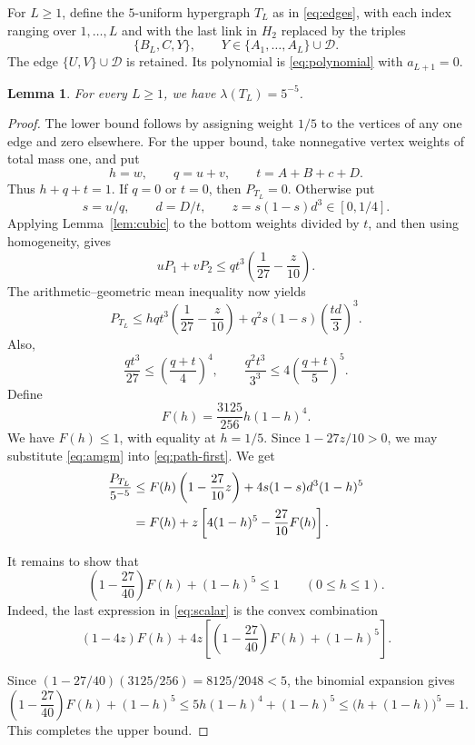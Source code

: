 \documentclass[11pt]{article}
\newtheorem{lemma}[theorem]{Lemma}
\numberwithin{equation}{section}
\newcommand{\D}{\mathcal D}
\begin{document}
For \(L\ge1\), define the \(5\)-uniform hypergraph \(T_L\)
as in \eqref{eq:edges}, with each index ranging over \(1,\ldots,L\)
and with the last link in \(H_2\) replaced by the triples
\[
 \{B_L,C,Y\},\qquad Y\in\{A_1,\ldots,A_L\}\cup\D.
\]
The edge \(\{U,V\}\cup\D\) is retained.
Its polynomial is \eqref{eq:polynomial} with \(a_{L+1}=0\).

\begin{lemma}\label{lem:path}
For every \(L\ge1\), we have \(\lambda(T_L)=5^{-5}\).
\end{lemma}

\begin{proof}
The lower bound follows by assigning weight \(1/5\) to the vertices
of any one edge and zero elsewhere. For the upper bound, take
nonnegative vertex weights of total mass one, and put
\[
 h=w,\qquad q=u+v,\qquad t=A+B+c+D.
\]
Thus \(h+q+t=1\). If \(q=0\) or \(t=0\), then \(P_{T_L}=0\).
Otherwise put
\[
 s=u/q,\qquad d=D/t,\qquad z=s(1-s)d^3\in[0,1/4].
\]
Applying Lemma~\ref{lem:cubic} to the bottom weights divided by
\(t\), and then using homogeneity, gives
\[
 uP_1+vP_2\le qt^3\left(\frac1{27}-\frac z{10}\right).
\]
The arithmetic--geometric mean inequality now yields
\begin{equation}\label{eq:path-first}
 P_{T_L}\le
 hqt^3
       \left(\frac1{27}-\frac z{10}\right)
 +q^2s(1-s)\left(\frac{td}{3}\right)^3.
\end{equation}
Also,
\begin{equation}\label{eq:amgm}
 \frac{qt^3}{27}\le\left(\frac{q+t}{4}\right)^4,
 \qquad
 \frac{q^2t^{3}}{3^{3}}\le4\left(\frac{q+t}{5}\right)^5.
\end{equation}
Define
\[
 F(h)=\frac{3125}{256}h(1-h)^4.
\]
We have \(F(h)\le1\), with equality at \(h=1/5\).
Since \(1-27z/10>0\), we may substitute \eqref{eq:amgm}
into \eqref{eq:path-first}. We get
\begin{align}
 \frac{P_{T_L}}{5^{-5}}
 &\le F(h)\left(1-\frac{27}{10}z\right)
        +4s(1-s)d^{3}(1-h)^5\notag\\
 &=F(h)+z\left[4(1-h)^5-\frac{27}{10}F(h)\right].
 \label{eq:scalar}
\end{align}

It remains to show that
\begin{equation}\label{eq:scalar-endpoint}
 \left(1-\frac{27}{40}\right)F(h)+(1-h)^5\le1
 \qquad(0\le h\le1).
\end{equation}
Indeed, the last expression in \eqref{eq:scalar} is the convex
combination
\[
 (1-4z)F(h)+4z\left[\left(1-\frac{27}{40}\right)F(h)+(1-h)^5\right].
\]

Since \((1-27/40)(3125/256)=8125/2048<5\), the binomial
expansion gives
\[
 \left(1-\frac{27}{40}\right)F(h)+(1-h)^5
 \le5h(1-h)^4+(1-h)^5
 \le\bigl(h+(1-h)\bigr)^5=1.
\]
This completes the upper bound.
\end{proof}
\end{document}
